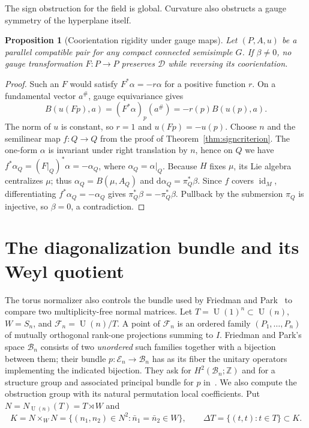 \documentclass[11pt]{amsart}
\newcommand{\U}{\operatorname{U}}
\newcommand{\dd}{\mathrm d}
\newcommand{\Z}{\mathbb Z}
\newcommand{\id}{\operatorname{id}}
\theoremstyle{plain}
\newtheorem{proposition}[theorem]{Proposition}
\theoremstyle{definition}
\theoremstyle{remark}
\begin{document}
The sign obstruction for the field is global.  Curvature also obstructs a gauge symmetry of the hyperplane itself.

\begin{proposition}[Coorientation rigidity under gauge maps]\label{prop:coorientation}
Let $(P,A,u)$ be a parallel compatible pair for any compact connected semisimple $G$.  If $\beta\ne0$, no gauge transformation $F:P\to P$ preserves $\mathcal D$ while reversing its coorientation.
\end{proposition}

\begin{proof}
Such an $F$ would satisfy $F^*\alpha=-r\alpha$ for a positive function $r$.  On a fundamental vector $a^\#$, gauge equivariance gives
\[
 B(u(Fp),a)=(F^*\alpha)_p(a^\#)
 =-r(p)B(u(p),a).
\]
The norm of $u$ is constant, so $r=1$ and $u(Fp)=-u(p)$.  Choose $n$ and the semilinear map $f:Q\to Q$ from the proof of Theorem~\ref{thm:signcriterion}.  The one-form $\alpha$ is invariant under right translation by $n$, hence on $Q$ we have $f^*\alpha_Q=(F|_Q)^*\alpha=-\alpha_Q$, where $\alpha_Q=\alpha|_Q$.  Because $H$ fixes $\mu$, its Lie algebra centralizes $\mu$; thus $\alpha_Q=B(\mu,A_Q)$ and $\dd\alpha_Q=\pi_Q^*\beta$.  Since $f$ covers $\id_M$, differentiating $f^*\alpha_Q=-\alpha_Q$ gives $\pi_Q^*\beta=-\pi_Q^*\beta$.  Pullback by the submersion $\pi_Q$ is injective, so $\beta=0$, a contradiction.
\end{proof}

\section{The diagonalization bundle and its Weyl quotient}

The torus normalizer also controls the bundle used by Friedman and
Park~\cite[Section~2]{FriedmanPark2016} to compare two multiplicity-free
normal matrices. Let $T=\U(1)^n\subset\U(n)$, $W=S_n$, and
$\mathcal F_n=\U(n)/T$. A point of $\mathcal F_n$ is an ordered family
$(P_1,\ldots,P_n)$ of mutually orthogonal rank-one projections summing to
$I$. Friedman and Park's space $\mathcal B_n$ consists of two
\emph{unordered} such families together with a bijection between them;
their bundle $p:\mathcal E_n\to\mathcal B_n$ has as its fiber the
unitary operators implementing the indicated bijection.  They ask for
$H^2(\mathcal B_n;\Z)$ and for a structure group and associated principal
bundle for $p$ in~\cite[Section~8]{FriedmanPark2016}.  We also compute
the obstruction group with its natural permutation local coefficients.
Put
$N=N_{\U(n)}(T)=T\rtimes W$ and
\[
 K=N\mathbin{\times_W}N
   =\{(n_1,n_2)\in N^2:\bar n_1=\bar n_2\in W\},
 \qquad \Delta T=\{(t,t):t\in T\}\subset K.
\]
\end{document}
